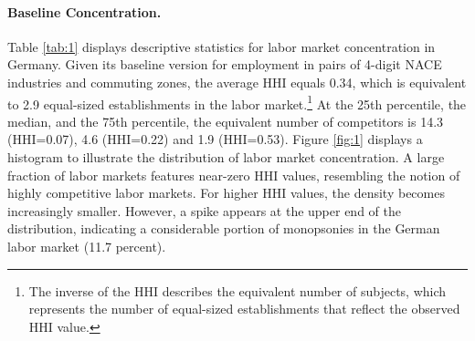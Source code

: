 \documentclass[11pt,oneside,reqno,xcolor=dvipsnames]{article} %
\begin{document}
\paragraph{Baseline Concentration.} Table \ref{tab:1} displays descriptive statistics for labor market concentration in Germany. Given its baseline version for employment in pairs of 4-digit NACE industries and commuting zones, the average HHI equals 0.34, which is equivalent to 2.9 equal-sized establishments in the labor market.\footnote{The inverse of the HHI describes the equivalent number of subjects, which represents the number of equal-sized establishments that reflect the observed HHI value.} At the 25th percentile, the median, and the 75th percentile, the equivalent number of competitors is 14.3 (HHI=0.07), 4.6 (HHI=0.22) and 1.9 (HHI=0.53). Figure \ref{fig:1} displays a histogram to illustrate the distribution of labor market concentration. A large fraction of labor markets features near-zero HHI values, resembling the notion of highly competitive labor markets. For higher HHI values, the density becomes increasingly smaller. However, a spike appears at the upper end of the distribution, indicating a considerable portion of monopsonies in the German labor market (11.7 percent).
\end{document}
